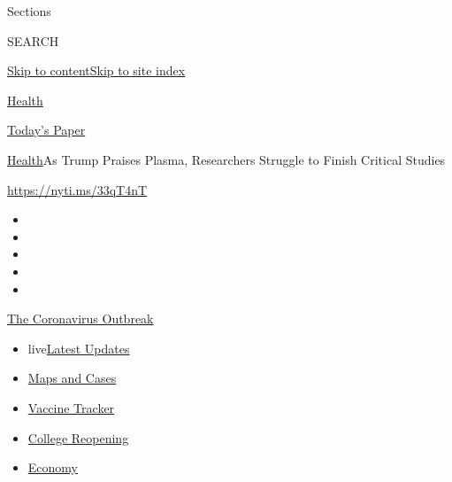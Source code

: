 Sections

SEARCH

\protect\hyperlink{site-content}{Skip to
content}\protect\hyperlink{site-index}{Skip to site index}

\href{https://www.nytimes.com/section/health}{Health}

\href{https://myaccount.nytimes.com/auth/login?response_type=cookie\&client_id=vi}{}

\href{https://www.nytimes.com/section/todayspaper}{Today's Paper}

\href{/section/health}{Health}\textbar{}As Trump Praises Plasma,
Researchers Struggle to Finish Critical Studies

\url{https://nyti.ms/33qT4nT}

\begin{itemize}
\item
\item
\item
\item
\item
\end{itemize}

\href{https://www.nytimes.com/news-event/coronavirus?action=click\&pgtype=Article\&state=default\&region=TOP_BANNER\&context=storylines_menu}{The
Coronavirus Outbreak}

\begin{itemize}
\tightlist
\item
  live\href{https://www.nytimes.com/2020/08/04/world/coronavirus-cases.html?action=click\&pgtype=Article\&state=default\&region=TOP_BANNER\&context=storylines_menu}{Latest
  Updates}
\item
  \href{https://www.nytimes.com/interactive/2020/us/coronavirus-us-cases.html?action=click\&pgtype=Article\&state=default\&region=TOP_BANNER\&context=storylines_menu}{Maps
  and Cases}
\item
  \href{https://www.nytimes.com/interactive/2020/science/coronavirus-vaccine-tracker.html?action=click\&pgtype=Article\&state=default\&region=TOP_BANNER\&context=storylines_menu}{Vaccine
  Tracker}
\item
  \href{https://www.nytimes.com/2020/08/02/us/covid-college-reopening.html?action=click\&pgtype=Article\&state=default\&region=TOP_BANNER\&context=storylines_menu}{College
  Reopening}
\item
  \href{https://www.nytimes.com/live/2020/08/04/business/stock-market-today-coronavirus?action=click\&pgtype=Article\&state=default\&region=TOP_BANNER\&context=storylines_menu}{Economy}
\end{itemize}

